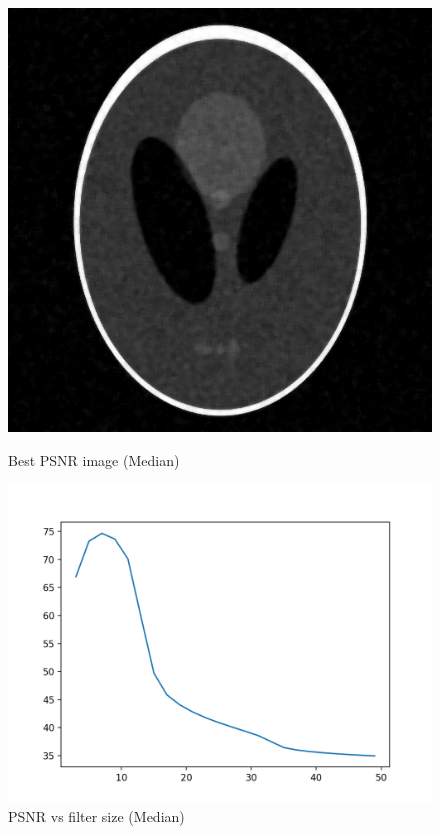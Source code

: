 \documentclass{article}
\begin{document}
    \begin{figure}[!htb]
      \includegraphics[scale=0.3]{./basic_denoising/shepplogan/median_best_gaussian.png}
      \caption{Best PSNR image (Median)}
    \endminipage \hfill
      \includegraphics[scale=.45]{./basic_denoising/shepplogan/median_psnr_gaussian.png}
      \caption{PSNR vs filter size (Median)}
    \endminipage
    \end{figure}
    \pagebreak
\end{document}
